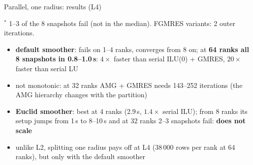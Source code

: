 \begin{frame}{Parallel, one radius: results (L4)}
    \footnotesize
    \begin{center}
    \end{center}
    \vspace{-0.4em}
    {\scriptsize $^*$ 1--3 of the 8 snapshots fail (not in the median). FGMRES variants: 2 outer iterations.}
    \begin{itemize}
        \item \textbf{default smoother}: fails on 1--4 ranks, converges from 8 on; at \textbf{64 ranks all 8 snapshots
              in 0.8--1.0\,s}: $4\times$ faster than serial ILU(0) + GMRES, $20\times$ faster than serial LU
        \item not monotonic: at 32 ranks AMG + GMRES needs 143--252 iterations (the AMG hierarchy changes with the partition)
        \item \textbf{Euclid smoother}: best at 4 ranks (2.9\,s, $1.4\times$ serial ILU); from 8 ranks its setup jumps
              from 1\,s to 8--10\,s and at 32 ranks 2--3 snapshots fail: \textbf{does not scale}
        \item unlike L2, splitting one radius pays off at L4 (38\,000 rows per rank at 64 ranks), but only with the default smoother
    \end{itemize}
\end{frame}

